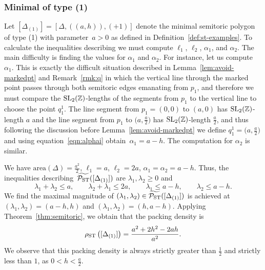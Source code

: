 \documentclass[pdftex]{sigma}
\numberwithin{equation}{section}
\def\Z{{\mathbb Z}}
\newcommand{\De}{\Delta}
\newcommand{\PSTtilde}{\widetilde{\mathcal{P}_{\rm ST}}}
\newcommand{\SL}{{\rm SL}_2(\Z)}
\begin{document}
\subsubsection{Minimal of type (1)}
\label{sec:type1-packing}
Let $[\De_{(1)}] = [\De,((a,h)),(+1)]$ denote the minimal semitoric polygon of type (1) with parameter~$a>0$ as defined in Definition~\ref{def:st-examples}.
To calculate the inequalities describing \smash{$\PSTtilde([\De_{(1)}])$} we must compute $\ell_1$, $\ell_2$, $\alpha_1$, and $\alpha_2$.
The main difficulty is finding the values for $\alpha_1$ and $\alpha_2$. For instance, let us compute $\alpha_1$.
This is exactly the difficult situation described in Lemma~\ref{lem:avoid-markedpt} and Remark~\ref{rmk:q} in which the vertical line through the marked point passes through both semitoric edges emanating from $p_1$, and therefore we must compare the $\SL$-lengths of the segments from $p_1$ to the vertical line to choose the point $q_1^1$.
The line segment from $p_1=(0,0)$ to $(a,0)$ has $\SL$-length $a$ and the line segment from $p_1$ to $\big(a,\frac{a}{2}\big)$ has $\SL$-length $\frac{a}{2}$, and thus following the discussion before Lemma~\ref{lem:avoid-markedpt} we define $q_1^1 = \big(a,\frac{a}{2}\big)$ and using equation~\eqref{eqn:alphai} obtain~$\alpha_1 = a-h$.
The computation for $\alpha_2$ is similar.


We have $\textrm{area}(\De) = \frac{a^2}{2}$, $\ell_1 = a$, $\ell_2 = 2a$, $\alpha_1 = \alpha_2 = a-h$. Thus, the inequalities describing~$\PSTtilde([\De_{(1)}])$ are $\lambda_1,\lambda_2\geq 0$ and
\begin{equation*}
\lambda_1+\lambda_2 \leq a,\qquad
 \lambda_2+\lambda_1 \leq 2a,\qquad
 \lambda_1 \leq a-h,\qquad
 \lambda_2 \leq a-h.
\end{equation*}
We find the maximal magnitude of $(\lambda_1,\lambda_2)\in\PSTtilde([\De_{(1)}])$ is achieved at $(\lambda_1,\lambda_2) = (a-h,h)$ and $(\lambda_1,\lambda_2) = (h,a-h)$.
Applying Theorem~\ref{thm:semitoric}, we obtain that the packing density is
\begin{equation}\label{eqn:stpack-1}
\rho_{{\rm ST}} \left([\De_{(1)}]\right) = \frac{a^2+2h^2-2ah}{a^2}.
\end{equation}
We observe that this packing density is always strictly greater than $\frac{1}{2}$ and strictly less than $1$, as $0< h < \frac{a}{2}$.
\end{document}
